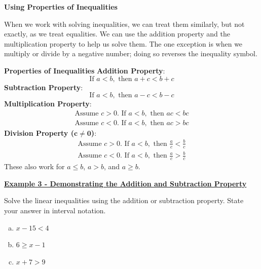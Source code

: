 \documentclass[12pt]{book}
\begin{document}
\newpage
{\large \textbf{Using Properties of Inequalities}}
\vspace{3mm}

When we work with solving inequalities, we can treat them similarly, but not exactly, as we treat equalities. We can use the addition property and the multiplication property to help us solve them. The one exception is when we multiply or divide by a negative number; doing so reverses the inequality symbol.
  
\begin{boxR}
    \textbf{Properties of Inequalities}
     \vspace{1mm}
    \hline
    \vspace{2mm}
    \textbf{Addition Property}: 
    $$\text{If } a < b, \text{ then } a + c < b+c$$
    \textbf{Subtraction Property}:
    $$ \text{If } a < b, \text{ then } a - c < b - c$$
    \textbf{Multiplication Property}:
    \vspace{-5mm}
    \begin{align*}
         \text{Assume } c >0. \text{ If } a < b, \text{ then } ac < bc \\ 
         \text{Assume } c <0.  \text{ If } a < b, \text{ then } ac > bc
    \end{align*}
     \textbf{Division Property ($\mathbf{c\neq 0}$)}:
    \vspace{-5mm}
    \begin{align*}
         \text{Assume } c >0. \text{ If } a < b, \text{ then } \frac{a}{c} < \frac{b}{c} \\ 
         \text{Assume } c <0.  \text{ If } a < b, \text{ then } \frac{a}{c} > \frac{b}{c}
    \end{align*}
    These also work for $a \leq b$, $a >b$, and $a \geq b$.
\end{boxR}
\underline{\textbf{Example 3 - Demonstrating the Addition and Subtraction Property}}

Solve the linear inequalities using the addition or subtraction property. State your answer in interval notation.
\begin{enumerate}[(a)]
    \item $x-15 < 4$
    \vspace{16mm}
    \item $6 \geq x-1$
    \vspace{16mm}
    \item $x+7 > 9$
    \vspace{16mm}
\end{enumerate}
\newpage
\end{document}
